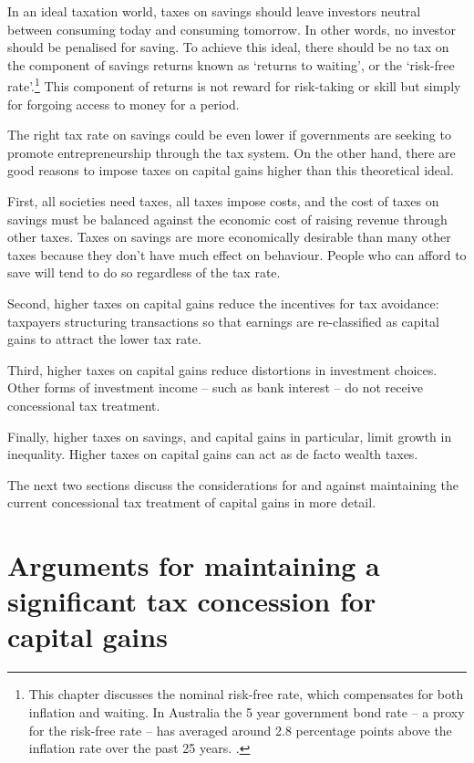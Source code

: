 In an ideal taxation world, taxes on savings should leave investors neutral between consuming today and consuming tomorrow. In other words, no investor should be penalised for saving. To achieve this ideal, there should be no tax on the component of savings returns known as ‘returns to waiting’, or the ‘risk-free rate’.\footnote{This chapter discusses the nominal risk-free rate, which compensates for both inflation and waiting. In Australia the 5 year government bond rate – a proxy for the risk-free rate – has averaged around 2.8 percentage points above the inflation rate over the past 25 years. \textcite{RBA2015CapitalMarketYields}.} This component of returns is not reward for risk-taking or skill but simply for forgoing access to money for a period. 

The right tax rate on savings could be even lower if governments are seeking to promote entrepreneurship through the tax system.
On the other hand, there are good reasons to impose taxes on capital gains higher than this theoretical ideal.

First, all societies need taxes, all taxes impose costs, and the cost of taxes on savings must be balanced against the economic cost of raising revenue through other taxes. Taxes on savings are more economically desirable than many other taxes because they don’t have much effect on behaviour. People who can afford to save will tend to do so regardless of the tax rate.

Second, higher taxes on capital gains reduce the incentives for tax avoidance: taxpayers structuring transactions so that earnings are re-classified as capital gains to attract the lower tax rate.

Third, higher taxes on capital gains reduce distortions in investment choices. Other forms of investment income – such as bank interest – do not receive concessional tax treatment. 

Finally, higher taxes on savings, and capital gains in particular, limit growth in inequality. Higher taxes on capital gains can act as de facto wealth taxes.  

The next two sections discuss the considerations for and against maintaining the current concessional tax treatment of capital gains in more detail.


\section{Arguments for maintaining a significant tax concession for capital gains}
